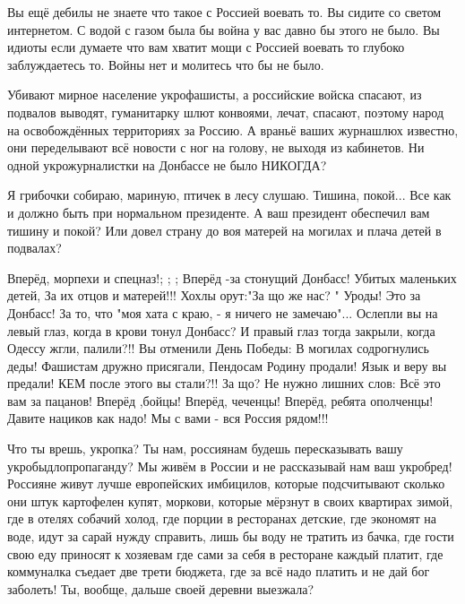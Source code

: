 Вы ещё дебилы не знаете что такое с Россией воевать то. Вы сидите со светом
интернетом. С водой с газом была бы война у вас давно бы этого не было. Вы
идиоты если думаете что вам хватит мощи с Россией воевать то глубоко
заблуждаетесь то. Войны нет и молитесь что бы не было.


Убивают мирное население укрофашисты, а российские войска спасают, из подвалов
выводят, гуманитарку шлют конвоями, лечат, спасают, поэтому народ на
освобождённых территориях за Россию. А враньё ваших журнашлюх известно, они
переделывают всё новости с ног на голову, не выходя из кабинетов. Ни одной
укрожурналистки на Донбассе не было НИКОГДА?


Я грибочки собираю, мариную, птичек в лесу слушаю. Тишина, покой... Все как и
должно быть при нормальном президенте. А ваш президент обеспечил вам тишину и
покой? Или довел страну до воя матерей на могилах и плача детей в подвалах?


Вперёд, морпехи и спецназ!; ; ;
Вперёд -за стонущий Донбасс!
Убитых маленьких детей,
За их отцов и матерей!!!
Хохлы орут:"За що же нас? "
Уроды! Это за Донбасс!
За то, что "моя хата с краю, -
я ничего не замечаю"...
Ослепли вы на левый глаз,
когда в крови тонул Донбасс?
И правый глаз тогда закрыли,
когда Одессу жгли, палили?!!
Вы отменили День Победы:
В могилах содрогнулись деды!
Фашистам дружно присягали,
Пендосам Родину продали!
Язык и веру вы предали!
КЕМ после этого вы стали?!!
За що? Не нужно лишних слов:
Всё это вам за пацанов!
Вперёд ,бойцы! Вперёд, чеченцы!
Вперёд, ребята ополченцы!
Давите нациков как надо!
Мы с вами - вся Россия рядом!!!


Что ты врешь, укропка? Ты нам, россиянам будешь пересказывать вашу
укробыдлопропаганду? Мы живём в России и не рассказывай нам ваш укробред!
Россияне живут лучше европейских имбицилов, которые подсчитывают сколько они
штук картофелен купят, моркови, которые мёрзнут в своих квартирах зимой, где в
отелях собачий холод, где порции в ресторанах детские, где экономят на воде,
идут за сарай нужду справить, лишь бы воду не тратить из бачка, где гости свою
еду приносят к хозяевам где сами за себя в ресторане каждый платит, где
коммуналка съедает две трети бюджета, где за всё надо платить и не дай бог
заболеть! Ты, вообще, дальше своей деревни выезжала?

